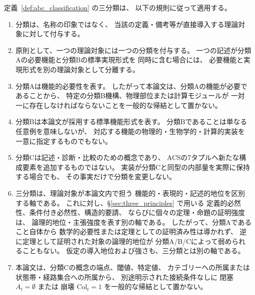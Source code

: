 \begin{remark}[三分類の適用規則]
\label{rem:abc_classification_rules}

定義~\ref{def:abc_classification} の三分類は、
以下の規則に従って適用する。

\begin{enumerate}
  \item 分類は、名称の印象ではなく、
        当該の定義・備考等が直接導入する理論対象に対して付与する。

  \item 原則として、一つの理論対象には一つの分類を付与する。
        一つの記述が分類Aの必要機能と分類Bの標準実現形式を
        同時に含む場合には、
        必要機能と実現形式を別の理論対象として分離する。

  \item 分類Aは機能的必要性を表す。
        したがって本論文は、分類Aの機能が必要であることから、
        特定の分類B機構、物理部位または計算モジュールが
        一対一に存在しなければならないことを一般的な帰結として置かない。

  \item 分類Bは本論文が採用する標準機能形式を表す。
        分類Bであることは単なる任意例を意味しないが、
        対応する機能の物理的・生物学的・計算的実装を
        一意に指定するものでもない。

  \item 分類Cは記述・診断・比較のための概念であり、
        ACSの7タプルへ新たな構成要素を追加するものではない。
        実装が分類Cと同型の内部量を実際に保持する場合でも、
        その事実だけで分類を変更しない。

  \item 三分類は、理論対象が本論文内で担う
        機能的・表現的・記述的地位を区別する軸である。
        これに対し、\S\ref{sec:three_principles} で用いる
        定義的必然性、条件付き必然性、構造的要請、
        ならびに個々の定理・命題の証明強度は、
        論理的地位・主張強度を表す別の軸である。
        したがって、分類Aであること自体から
        数学的必要性または定理としての証明済み性は導かれず、
        逆に定理として証明された対象の論理的地位が
        分類A/B/Cによって弱められることもない。
        仮定の導入地位および強さも、三分類とは別の軸である。

  \item 本論文は、分類Cの概念の端点、閾値、特定値、
        カテゴリーへの所属または状態帯・経路集合への所属から、
        別途明示された接続条件なしに
        閉塞 $A_t=\emptyset$ または
        崩壊 $\mathrm{Col}_t=1$ を一般的な帰結として置かない。


\end{enumerate}
\end{remark}

